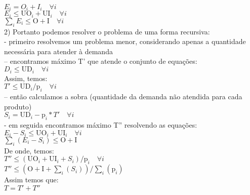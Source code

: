 \documentclass{book}
\begin{document}
$E_i = O_i + I_i \quad \forall i $ \\

$E_i \leq \textrm{UO}_i + \textrm{UI}_i \quad \forall i$ \\

$\sum_i{E_i} \leq \textrm{O} + \textrm{I} \quad \forall i$ \\

2) Portanto podemos resolver o problema de uma forma recursiva: \\

 - primeiro resolvemos um problema menor, considerando apenas a quantidade necessária para atender à demanda \\
 
 		-- encontramos máximo T' que atende o conjunto de equações: \\
 		
 		$D_i \leq \textrm{UD}_i \quad \forall i$ \\
 		
 		Assim, temos: \\
 		
 		$ T' \leq \textrm{UD}_i/\textrm{p}_i \quad \forall i$ \\
 		
 		-- então calculamos a sobra (quantidade da demanda não atendida para cada produto) \\
 		
 		$S_i = \textrm{UD}_i - \textrm{p}_i * T' \quad \forall i$ \\
 
 - em seguida encontramos máximo T'' resolvendo as equações: \\
 
$E_i - S_i \leq \textrm{UO}_i + \textrm{UI}_i \quad \forall i$ \\

$\sum_i{(E_i- S_i)} \leq \textrm{O} + \textrm{I}$ \\

De onde, temos: \\
 
$T'' \leq (\textrm{UO}_i + \textrm{UI}_i + S_i) / \textrm{p}_i  \quad \forall i$ \\

$T'' \leq (\textrm{O} + \textrm{I} + \sum_i{(S_i)}) / \sum_i{(\textrm{p}_i)}$ \\

Assim temos que: \\

$T = T' + T''$ \\
\end{document}
